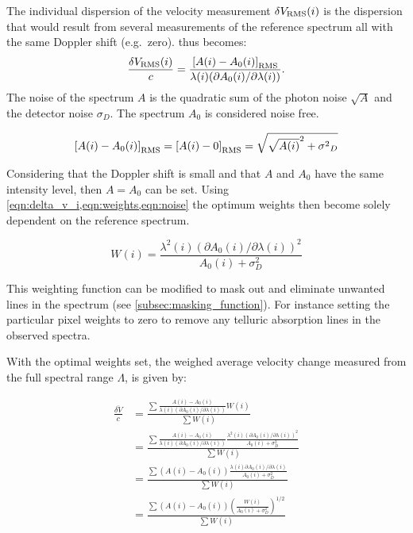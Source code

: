 The individual dispersion of the velocity measurement \(\delta V_{\textrm{RMS}}(i)\) is the dispersion that would result from several measurements of the reference spectrum all with the same Doppler shift (e.g.\ zero).
 thus becomes:
\begin{equation}
\frac{\delta V_{\textrm{RMS}}(i)}{c} = \frac{{[A(i) - {A}_{0}(i)]}_{\textrm{RMS}} }{\lambda(i) (\partial {A}_{0}(i)/\partial \lambda(i))}.
\label{eqn:delta_v_i_rms}
\end{equation}
The noise of the spectrum \(A\) is the quadratic sum of the photon noise \(\sqrt{A}\) and the detector noise \({\sigma}_{D}\).
The spectrum \({A}_{0}\) is considered noise free.

\begin{equation}
{[{A(i)-{A}_{0}(i)}]}_{\textrm{RMS}} = {[{A(i)} - 0]}_{\textrm{RMS}} = \sqrt{{\sqrt{A(i)}}^{2} + {{\sigma}^{2}}_{D}} \label{eqn:noise}
\end{equation}

Considering that the Doppler shift is small and that \(A\) and \({A}_{0}\) have the same intensity level, then \(A = {A}_{0}\) can be set.
Using \cref{eqn:delta_v_i,eqn:weights,eqn:noise} the optimum weights then become solely dependent on the reference spectrum.

\begin{equation}
W(i) = \frac{{\lambda}^{2}(i) {({\partial {A}_{0}(i)}/{\partial \lambda(i)})}^{2}}{A_0(i) + {\sigma}^{2}_{D}} \label{eqn:optimal_weight}
\end{equation}

This weighting function can be modified to mask out and eliminate unwanted lines in the spectrum (see \cref{subsec:masking_function}).
For instance setting the particular pixel weights to zero to remove any telluric absorption lines in the observed spectra.

With the optimal weights set, the weighed average velocity change measured from the full spectral range \(\Lambda\), is given by:

\begin{align}
\frac{\overline{\delta V}}{c} &= \frac{
    \sum{
        \frac
        {A(i) - {A}_{0}(i)}{
            \lambda(i) \left({\partial {A}_{0}(i)}/{\partial \lambda(i)}\right)} W(i)}
}
{\sum{{W(i)}}} \\
&= \frac{
    \sum {
        \frac
        {A(i) - {A}_{0}(i)}
        {\lambda(i) (\partial {A}_{0}(i)/\partial \lambda(i))}
        \frac
        {{\lambda}^{2}(i) {({\partial {A}_{0}(i)}/{\partial \lambda(i)})}^{2}}
        {A_{0}(i) + {\sigma}^{2}_{D}}
    }
}
{\sum{{W(i)}}} \\
&= \frac{
    \sum { 
        (A(i) - {A}_{0}(i))
        \frac
        {\lambda(i) {\partial {A}_{0}(i)}/{\partial \lambda(i)}}
        {A_{0}(i) + {\sigma}^{2}_{D}}
    }
}
{\sum{{W(i)}}} \\
&= \frac{\sum{(A(i) - {A}_{0}(i)){\left(\frac{W(i)}{{A}_{0}(i) +{\sigma}_{D}^{2}}\right)}^{1/2}}}{\sum{W(i)}}
\label{eqn:delta_v_eqarray}
\end{align}

